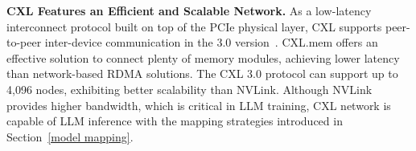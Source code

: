 \textbf{CXL Features an Efficient and Scalable Network.}
As a low-latency interconnect protocol built on top of the PCIe physical layer, CXL supports peer-to-peer inter-device communication in the 3.0 version~\cite{CXL}. CXL.mem offers an effective solution to connect plenty of memory modules, achieving lower latency than network-based RDMA solutions. The CXL 3.0 protocol can support up to 4,096 nodes, exhibiting better scalability than NVLink. Although NVLink provides higher bandwidth, which is critical in LLM training, CXL network is capable of LLM inference with the mapping strategies introduced in Section~\ref{model mapping}.













